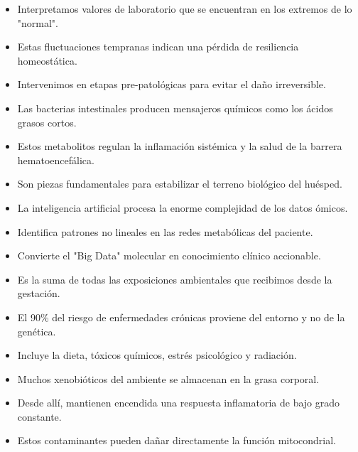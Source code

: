 \begin{itemize}
    \item Interpretamos valores de laboratorio que se encuentran en los extremos de lo "normal".
    \item Estas fluctuaciones tempranas indican una pérdida de resiliencia homeostática.
    \item Intervenimos en etapas pre-patológicas para evitar el daño irreversible.
\end{itemize}

\begin{itemize}
    \item Las bacterias intestinales producen mensajeros químicos como los ácidos grasos cortos.
    \item Estos metabolitos regulan la inflamación sistémica y la salud de la barrera hematoencefálica.
    \item Son piezas fundamentales para estabilizar el terreno biológico del huésped.
\end{itemize}

\begin{itemize}
    \item La inteligencia artificial procesa la enorme complejidad de los datos ómicos.
    \item Identifica patrones no lineales en las redes metabólicas del paciente.
    \item Convierte el "Big Data" molecular en conocimiento clínico accionable.
\end{itemize}

\begin{itemize}
    \item Es la suma de todas las exposiciones ambientales que recibimos desde la gestación.
    \item El 90\% del riesgo de enfermedades crónicas proviene del entorno y no de la genética.
    \item Incluye la dieta, tóxicos químicos, estrés psicológico y radiación.
\end{itemize}

\begin{itemize}
    \item Muchos xenobióticos del ambiente se almacenan en la grasa corporal.
    \item Desde allí, mantienen encendida una respuesta inflamatoria de bajo grado constante.
    \item Estos contaminantes pueden dañar directamente la función mitocondrial.
\end{itemize}

